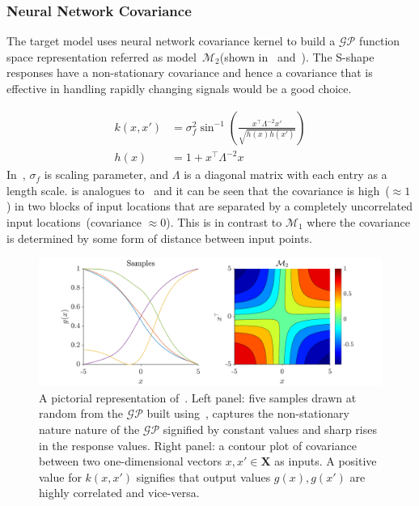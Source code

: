 \subsubsection{Neural Network Covariance}
The target model uses neural network covariance kernel to build a \(\mathcal{GP}\) function space representation referred as model~\(\mathcal{M}_2\)(shown in~ and~).
The S-shape responses have a non-stationary covariance and hence a covariance that is effective in handling rapidly changing signals would be a good choice. 

\begin{align}
        k(x,x') &= \sigma_f^2 \sin^{-1}\left({\frac{x^{\top}\Lambda^{-2}x'}{\sqrt{h(x)h(x')}}}\right) \label{eq:covNNone}\\
        h(x) &= 1+x^{\top}\Lambda^{-2}x \nonumber
\end{align}
In~, \(\sigma_f\) is scaling parameter, and \(\Lambda\) is a diagonal matrix with each entry as a length scale.
 is analogues to~ and it can be seen that the covariance is high~(\(\approx 1\)) in two blocks of input locations that are separated by a completely uncorrelated input locations~(covariance \(\approx 0\)). 
This is in contrast to \(\mathcal{M}_1\) where the covariance is determined by some form of distance between input points. 
\begin{figure}[h]
    \centering
    \includegraphics[scale=0.5]{Chapter-3/figures/Model2.png}
    \caption{A pictorial representation of~. Left panel: five samples drawn at random from the \(\mathcal{GP}\) built using~, captures the non-stationary nature nature of the \(\mathcal{GP}\) signified by constant values and sharp rises in the response values. Right panel: a contour plot of covariance between two one-dimensional vectors \(x,x' \in \textbf{X}\) as inputs. A positive value for \(k(x,x')\) signifies that output values \(g(x), g(x')\) are highly correlated and vice-versa. }
    \label{fig:covNNone}
\end{figure}


